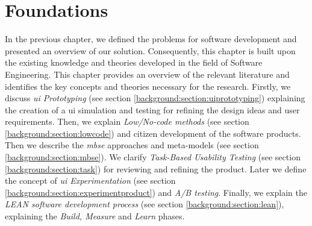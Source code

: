 
\chapter{Foundations}
\label{chap:foundations}
\ifpdf
    \graphicspath{{Chapters/Background/Figs/}{Chapters/Background/Figs/}{Chapters/Background/Figs/}}
\else
    \graphicspath{{Chapters/Background/Figs/}{Chapters/Background/Figs/}}
\fi
In the previous chapter, we defined the problems for software development and presented an overview of our solution.
Consequently, this chapter is built upon the existing knowledge and theories developed in the field of Software Engineering.
This chapter provides an overview of the relevant literature and identifies the key concepts and theories necessary for the research. 
Firstly, we discuss \textit{\ac{ui} Prototyping} (see section \ref{background:section:uiprototyping}) explaining the creation of a \ac{ui} simulation and testing for refining the design ideas and user requirements.
Then, we explain \textit{Low/No-code methods} (see section \ref{background:section:lowcode}) and citizen development of the software products. 
Then we describe the \textit{\ac{mbse}} approaches and meta-models (see section \ref{background:section:mbse}).
We clarify \textit{Task-Based Usability Testing} (see section \ref{background:section:task}) for reviewing and refining the product. 
Later we define the concept of \textit{\ac{ui} Experimentation} (see section \ref{background:section:experimentproduct}) and \textit{A/B testing}. 
Finally, we explain the \textit{LEAN software development process} (see section \ref{background:section:lean}), explaining the \textit{Build, Measure} and \textit{Learn} phases.

